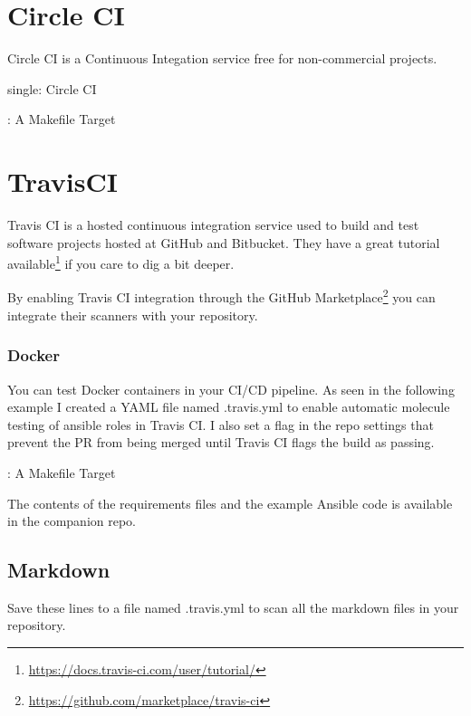 \section{Circle CI}

Circle CI is a Continuous Integation service free for non-commercial
projects.

single: Circle CI

\justify
\begin{mybox}{\thetcbcounter: A Makefile Target}
	
\end{mybox}

\section{TravisCI}

\justify
Travis CI is a hosted continuous integration service used to build and
test software projects hosted at GitHub and Bitbucket. They have a great
tutorial available\footnote{\url{https://docs.travis-ci.com/user/tutorial/}}
if you care to dig a bit deeper.

\justify
By enabling Travis CI integration through the GitHub
Marketplace\footnote{\url{https://github.com/marketplace/travis-ci}} you
can integrate their scanners with your repository.

\subsubsection{Docker}

\justify
You can test Docker containers in your CI/CD pipeline. As seen in the
following example I created a YAML file named .travis.yml to enable
automatic molecule testing of ansible roles in Travis CI. I also set a
flag in the repo settings that prevent the PR from being merged until
Travis CI flags the build as passing.

\justify
\begin{mybox}{\thetcbcounter: A Makefile Target}
	
\end{mybox}

The contents of the requirements files and the example Ansible code is
available in the companion repo.


\subsection{Markdown}

Save these lines to a file named .travis.yml to scan all the markdown files in your repository.

